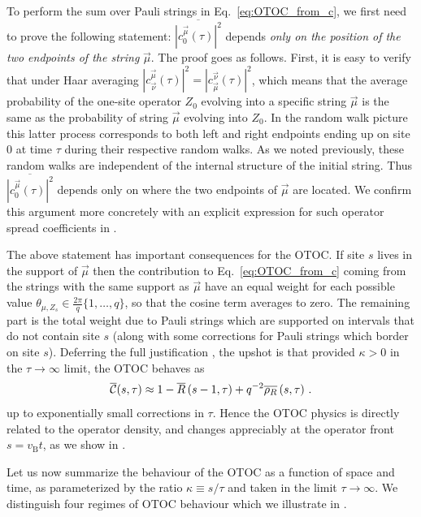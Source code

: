 \documentclass[aps,prb,twocolumn,superscriptaddress]{revtex4-1}
\begin{document}
To perform the sum over Pauli strings in Eq.~\eqref{eq:OTOC_from_c}, we first need to prove the following statement: $\overline{|c_0^{\vec{\mu}}(\tau)|^2}$ depends \emph{only on the position of the two endpoints of the string} $\vec{\mu}$. The proof goes as follows. First, it is easy to verify that under Haar averaging $|c_{\vec{\nu}}^{\vec{\mu}}(\tau)|^2 = |c_{\vec{\mu}}^{\vec{\nu}}(\tau)|^2$, which means that the average probability of the one-site operator $Z_0$ evolving into a specific string $\vec{\mu}$ is the same as the probability of string $\vec{\mu}$ evolving into $Z_0$. In the random walk picture this latter process corresponds to both left and right endpoints ending up on site $0$ at time $\tau$ during their respective random walks. As we noted previously, these random walks are independent of the internal structure of the initial string. Thus $\overline{|c_0^{\vec{\mu}}(\tau)|^2}$ depends only on where the two endpoints of $\vec{\mu}$ are located. We confirm this argument more concretely with an explicit expression for such operator spread coefficients in .

The above statement has important consequences for the OTOC. If site $s$ lives in the support of $\vec{\mu}$ then the contribution to Eq.~\eqref{eq:OTOC_from_c} coming from the strings with the same support as $\vec{\mu}$ have an equal weight for each possible value $\theta_{\mu,Z_{s}} \in \frac{2\pi}{q}\{1,\ldots,q\}$, so that the cosine term averages to zero. The remaining part is the total weight due to Pauli strings which are supported on intervals that do not contain site $s$ (along with some corrections for Pauli strings which border on site $s$). Deferring the full justification , the upshot is that provided $\kappa>0$ in the $\tau\rightarrow\infty$ limit, the OTOC behaves as
\begin{equation}\label{eq:OTOCtoR}
\overline{\mathcal{C}}(s,\tau) \approx 1-\overline{R}\left(s-1,\tau\right) +  q^{-2}\overline{\rho_{R}}\left(s,\tau\right)\,.
\end{equation}
up to exponentially small corrections in $\tau$. Hence the OTOC physics is directly related to the operator density, and changes appreciably at the operator front $s=v_{\text{B}}t$, as we show in .

Let us now summarize the behaviour of the OTOC as a function of space and time, as parameterized by the ratio $\kappa \equiv s/\tau$ and taken in the limit $\tau\rightarrow\infty$. We  distinguish four regimes of OTOC behaviour which we illustrate in . 
\end{document}
